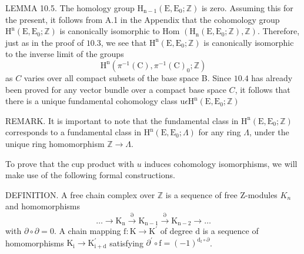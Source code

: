 \documentclass[10pt]{article}
\begin{document}
LEMMA 10.5. The homology group $\mathrm{H}_{\mathrm{n}-1}\left(\mathrm{E}, \mathrm{E}_{0} ; \mathbb{Z}\right)$ is zero. Assuming this for the present, it follows from A.1 in the Appendix that the cohomology group $\mathrm{H}^{\mathrm{n}}\left(\mathrm{E}, \mathrm{E}_{0} ; \mathbb{Z}\right)$ is canonically isomorphic to Hom $\left(\mathrm{H}_{\mathrm{n}}\left(\mathrm{E}, \mathrm{E}_{0} ; \mathbb{Z}\right), \mathbb{Z}\right)$. Therefore, just as in the proof of $10.3$, we see that $\mathrm{H}^{\mathrm{n}}\left(\mathrm{E}, \mathrm{E}_{0} ; \mathbb{Z}\right)$ is canonically isomorphic to the inverse limit of the groups
$$
\mathrm{H}^{\mathrm{n}}\left(\pi^{-1}(\mathrm{C}), \pi^{-1}(\mathrm{C})_{0} ; \mathbb{Z}\right)
$$
as $C$ varies over all compact subsets of the base space B. Since $10.4$ has already been proved for any vector bundle over a compact base space $C$, it follows that there is a unique fundamental cohomology class $\mathrm{u} \epsilon \mathrm{H}^{\mathrm{n}}\left(\mathrm{E}, \mathrm{E}_{0} ; \mathbb{Z}\right)$

REMARK. It is important to note that the fundamental class in $\mathrm{H}^{\mathrm{n}}\left(\mathrm{E}, \mathrm{E}_{0} ; \mathbb{Z}\right)$ corresponds to a fundamental class in $\mathrm{H}^{\mathrm{n}}\left(\mathrm{E}, \mathrm{E}_{0} ; \Lambda\right)$ for any ring $\Lambda$, under the unique ring homomorphism $\mathbb{Z} \rightarrow \Lambda$.

To prove that the cup product with $u$ induces cohomology isomorphisms, we will make use of the following formal constructions.

DEFINITION. A free chain complex over $\mathbb{Z}$ is a sequence of free Z-modules $K_{n}$ and homomorphisms
$$
\ldots \longrightarrow \mathrm{K}_{\mathrm{n}} \stackrel{\partial}{\longrightarrow} \mathrm{K}_{\mathrm{n}-1} \stackrel{\partial}{\longrightarrow} \mathrm{K}_{\mathrm{n}-2} \longrightarrow \ldots
$$
with $\partial \circ \partial=0$. A chain mapping $\mathrm{f}: \mathrm{K} \rightarrow \mathrm{K}^{\prime}$ of degree $\mathrm{d}$ is a sequence of homomorphisms $\mathrm{K}_{\mathrm{i}} \rightarrow \mathrm{K}_{\mathrm{i}+\mathrm{d}}^{\prime}$ satisfying $\partial^{\prime} \circ \mathrm{f}=(-1)^{\mathrm{d}_{\mathrm{f}} \circ \partial}$.
\end{document}
